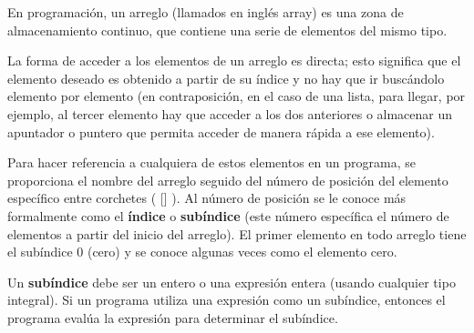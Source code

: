 En programación, un arreglo (llamados en inglés array) es una zona de almacenamiento continuo, que contiene una serie de elementos del mismo tipo. 

La forma de acceder a los elementos de un arreglo es directa; esto significa que el elemento deseado es obtenido a partir de su índice y no hay que ir buscándolo elemento por elemento (en contraposición, en el caso de una lista, para llegar, por ejemplo, al tercer elemento hay que acceder a los dos anteriores o almacenar un apuntador o puntero que permita acceder de manera rápida a ese elemento).

Para hacer referencia
a cualquiera de estos elementos en un programa, se proporciona el nombre del arreglo seguido del número de posición
del elemento específico entre corchetes ( [] ). Al número de posición se le conoce más formalmente como el \textbf{índice}
o \textbf{subíndice} (este número específica el número de elementos a partir del inicio del arreglo). El primer elemento en todo
arreglo tiene el subíndice 0 (cero) y se conoce algunas veces como el elemento cero.

Un \textbf{subíndice} debe ser un entero o una expresión entera (usando cualquier tipo integral). Si un programa utiliza una
expresión como un subíndice, entonces el programa evalúa la expresión para determinar el subíndice.
